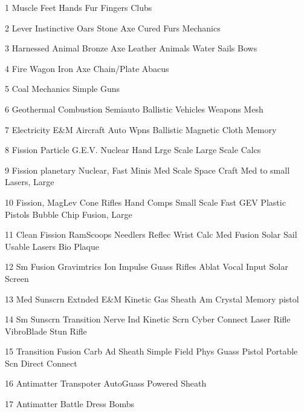 1		Muscle						Feet		Hands		Fur			Fingers
												Clubs

2		Lever		    Instinctive		Oars		Stone Axe	Cured Furs	
					    Mechanics		

3		Harnessed					Animal		Bronze Axe	Leather		
		Animals						Water Sails	Bows


4		Fire						Wagon		Iron Axe	Chain/Plate	Abacus
												

5		Coal		    Mechanics					Simple Guns				


6		Geothermal					Combustion	Semiauto	Ballistic	 
									Vehicles	Weapons		Mesh


7		Electricity	E&M				Aircraft	Auto Wpns	Ballistic	Magnetic 
															Cloth		Memory


8		Fission 	Particle		G.E.V.		Nuclear 				Hand
		Lrge Scale								Large Scale				Calcs


9		Fission 					planetary	Nuclear,				Fast Minis
		Med Scale					Space Craft	Med to small			
												Lasers,
												Large


10		Fission,					MagLev		Cone Rifles				Hand Comps
		Small Scale					Fast GEV	Plastic Pistols			Bubble Chip
		Fusion, 					
		Large


11		Clean Fission				RamScoops	Needlers		Reflec	Wrist Calc	
		Med Fusion					Solar Sail	Usable Lasers			Bio Plaque


12		Sm Fusion		Gravimtrics	Ion Impulse	Guass Rifles	Ablat	Vocal Input
		Solar Screen				


13		Med Sunscrn		Extnded E&M				Kinetic Gas		Sheath Am	Crystal Memory		 							
												pistol


14		Sm Sunscrn					Transition	Nerve Ind		Kinetic Scrn	Cyber Connect
												Laser Rifle	
												VibroBlade
												Stun Rifle	

15						Transition 				Fusion Carb		Ad Sheath		Simple
						Field Phys				Guass Pistol	Portable Scn	Direct Connect


16		Antimatter					Transpoter	AutoGuass		Powered			
																Sheath
  
	

17												Antimatter 		Battle Dress
												Bombs



